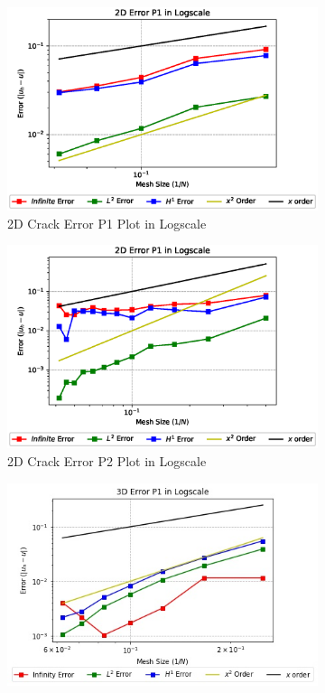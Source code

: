\documentclass[a4paper,11pt]{article}
\begin{document}
\begin{figure}[h!]
	\begin{subfigure}[b]{0.5\linewidth}
		\centering
		\includegraphics[width=\linewidth]{picture/conference/all2derrorP1crack}
		\caption{2D Crack Error P1 Plot in Logscale}
		\label{fig:2derrorP1crack}
	\end{subfigure}
	\quad
	\begin{subfigure}[b]{0.5\linewidth}
		\centering
		\includegraphics[width=\linewidth]{picture/conference/all2derrorP2crack}
		\caption{2D Crack Error P2 Plot in Logscale}
		\label{fig:2derrorP2crack}
	\end{subfigure}
\iffalse
	\begin{subfigure}[b]{0.5\linewidth}
		\centering
		\includegraphics[width=\linewidth]{picture/conference/all3derrorP1}

\end{subfigure}
\end{figure}
\end{document}
